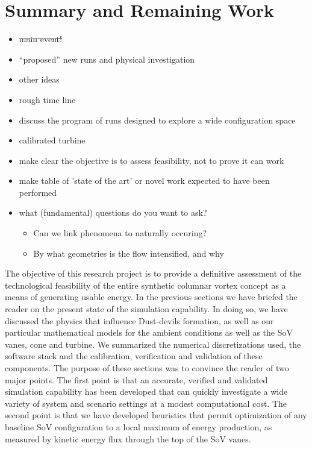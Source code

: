\section{Summary and Remaining Work}
\label{sec:future_work}

\begin{itemize}
\item \st{main event!}
\item ``proposed'' new runs and physical investigation
\item other ideas
\item rough time line
\item discuss the program of runs designed to explore a wide configuration space
\item calibrated turbine
\item make clear the objective is to assess feasibility, not to prove it can work
\item make table of 'state of the art' or novel work expected to have been performed
\item what (fundamental) questions do you want to ask?
      \begin{itemize}
      \item Can we link phenomena to naturally occuring?
      \item By what geometries is the flow intensified, and why
      \end{itemize}
\end{itemize}

The objective of this research project is to provide a definitive assessment of the 
technological feasibility of the entire synthetic columnar vortex concept as a 
means of generating usable energy. In the 
previous sections we have briefed the reader on the present state of the simulation capability. 
In doing so, we have discussed the physics that influence 
Dust-devils formation, as well as our particular mathematical models for the ambient conditions 
as well as the SoV vanes, cone and turbine. We summarized the numerical discretizations used, the software stack 
and the calibration, verification and validation of these components. 
The purpose of these sections was to convince the reader of two major points. 
The first point is that an accurate, verified and validated simulation capability has been developed
that can quickly investigate a wide variety of system and scenario settings 
at a modest computational cost. 
The second point is that we have developed heuristics that permit optimization of any baseline SoV
configuration to a local maximum of energy production, as measured by kinetic energy flux 
through the top of the SoV vanes. 

